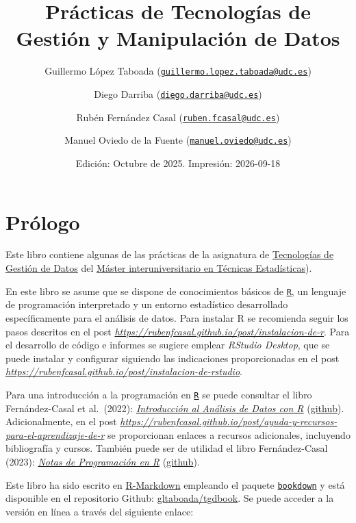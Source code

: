 \documentclass[
]{book}
\title{Prácticas de Tecnologías de Gestión y Manipulación de Datos}
\author{Guillermo López Taboada (\href{mailto:guillermo.lopez.taboada@udc.es}{\nolinkurl{guillermo.lopez.taboada@udc.es}}) \and Diego Darriba (\href{mailto:diego.darriba@udc.es}{\nolinkurl{diego.darriba@udc.es}}) \and Rubén Fernández Casal (\href{mailto:ruben.fcasal@udc.es}{\nolinkurl{ruben.fcasal@udc.es}}) \and Manuel Oviedo de la Fuente (\href{mailto:manuel.oviedo@udc.es}{\nolinkurl{manuel.oviedo@udc.es}})}
\date{Edición: Octubre de 2025. Impresión: 2026-09-18}
\theoremstyle{break}
\theoremstyle{nonumberplain}
\begin{document}
\maketitle

{
\setcounter{tocdepth}{1}
\tableofcontents
}
\chapter*{Prólogo}\label{pruxf3logo}

Este libro contiene algunas de las prácticas de la asignatura de
\href{http://eamo.usc.es/pub/mte/index.php/es/?option=com_content&view=article&id=2202&idm=38&a\%C3\%B1o=2020}{Tecnologías de Gestión de
Datos}
del \href{http://eio.usc.es/pub/mte}{Máster interuniversitario en Técnicas
Estadísticas}).

En este libro se asume que se dispone de conocimientos básicos de \href{https://www.r-project.org}{\texttt{R}}, un lenguaje de programación interpretado y un entorno estadístico desarrollado específicamente para el análisis de datos.
Para instalar R se recomienda seguir los pasos descritos en el post \href{https://rubenfcasal.github.io/post/instalacion-de-r}{\emph{https://rubenfcasal.github.io/post/instalacion-de-r}}.
Para el desarrollo de código e informes se sugiere emplear \emph{RStudio Desktop}, que se puede instalar y configurar siguiendo las indicaciones proporcionadas en el post \href{https://rubenfcasal.github.io/post/instalacion-de-rstudio}{\emph{https://rubenfcasal.github.io/post/instalacion-de-rstudio}}.

Para una introducción a la programación en \href{https://www.r-project.org}{\texttt{R}} se puede consultar el libro Fernández-Casal et al.~(2022): \emph{\href{https://rubenfcasal.github.io/intror}{Introducción al Análisis de Datos con R}} (\href{https://github.com/rubenfcasal/intror}{github}).
Adicionalmente, en el post \href{https://rubenfcasal.github.io/post/ayuda-y-recursos-para-el-aprendizaje-de-r}{\emph{https://rubenfcasal.github.io/post/ayuda-y-recursos-para-el-aprendizaje-de-r}} se proporcionan enlaces a recursos adicionales, incluyendo bibliografía y cursos.
También puede ser de utilidad el libro Fernández-Casal (2023): \emph{\href{https://rubenfcasal.github.io/book_notasr}{Notas de Programación en R}} (\href{https://github.com/rubenfcasal/book_notasr}{github}).

Este libro ha sido escrito en \href{http://rmarkdown.rstudio.com}{R-Markdown}
empleando el paquete \href{https://bookdown.org/yihui/bookdown/}{\texttt{bookdown}}
y está disponible en el repositorio Github:
\href{https://github.com/gltaboada/tgdbook}{gltaboada/tgdbook}. Se puede
acceder a la versión en línea a través del siguiente enlace:
\end{document}
